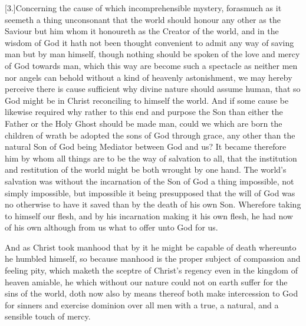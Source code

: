 [3.]Concerning the cause of which incomprehensible mystery, forasmuch as it seemeth a thing unconsonant that the world should honour any other as the Saviour but him whom it honoureth as the Creator of the world, and in the wisdom of God it hath not been thought convenient to admit any way of  saving man but by man himself,
 though nothing should be spoken of the love and mercy of God towards man, which this way are become such a spectacle as neither men nor angels can behold without a kind of heavenly astonishment, we may hereby perceive there is cause sufficient why divine nature should assume human, that so God might be in Christ reconciling to himself the world. And if some cause be likewise required why rather to this end and purpose the Son than either the Father or the Holy Ghost should be made man, could we which are born the children of wrath be adopted the sons of God through grace, any other than the natural Son of God being Mediator between God and us? It became therefore him by whom all things are to be the way of salvation to all, that the institution and restitution of the world might be both wrought by one hand. The world’s salvation was without the incarnation of the Son of God a thing impossible, not simply impossible, but impossible it being presupposed that the will of God was no otherwise to have it saved than by the death of his own Son. Wherefore taking to himself our flesh, and by his incarnation making it his own flesh, he had now of his own although from us what to offer unto God for us.

And as Christ took manhood that by it he might be capable of death whereunto he humbled himself, so because manhood is the proper subject of compassion and feeling pity, which maketh the sceptre of Christ’s regency even in the kingdom of heaven amiable, he which without our nature could not on earth suffer for the sins of the world, doth now also by means thereof both make intercession to God for sinners and exercise dominion over all men with a true, a natural, and a sensible touch of mercy.


